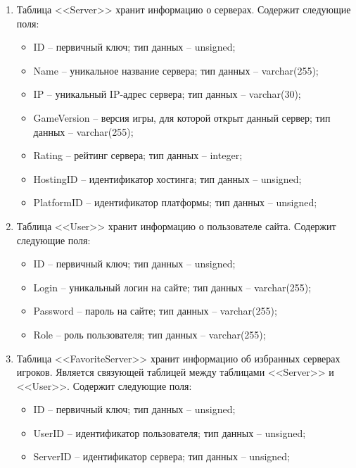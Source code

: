 \begin{enumerate}
    \item Таблица <<Server>> хранит информацию о серверах. Содержит следующие поля:
        \begin{itemize}
            \item ID -- первичный ключ; тип данных -- unsigned;
            \item Name -- уникальное название сервера; тип данных -- varchar(255);
            \item IP -- уникальный IP-адрес сервера; тип данных -- varchar(30);
            \item GameVersion -- версия игры, для которой открыт данный сервер; тип данных -- varchar(255);
            \item Rating -- рейтинг сервера; тип данных -- integer;
            \item HostingID -- идентификатор хостинга; тип данных -- unsigned;
            \item PlatformID -- идентификатор платформы; тип данных -- unsigned;
        \end{itemize}

        \item Таблица <<User>> хранит информацию о пользователе сайта. Содержит следующие поля:
        \begin{itemize}
            \item ID -- первичный ключ; тип данных -- unsigned;
            \item Login -- уникальный логин на сайте; тип данных -- varchar(255);
            \item Password -- пароль на сайте; тип данных -- varchar(255);
            \item Role -- роль пользователя; тип данных -- varchar(255);
        \end{itemize}

        \item Таблица <<FavoriteServer>> хранит информацию об избранных серверах игроков. Является связующей таблицей между таблицами <<Server>> и <<User>>. Содержит следующие поля:
        \begin{itemize}
            \item ID -- первичный ключ; тип данных -- unsigned;
            \item UserID -- идентификатор пользователя; тип данных -- unsigned;
            \item ServerID -- идентификатор сервера; тип данных -- unsigned;
        \end{itemize}


\end{enumerate}
